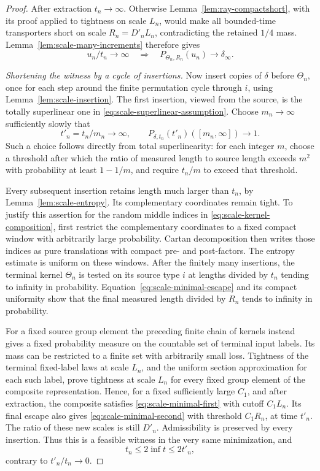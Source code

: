\begin{proof}
After extraction \(t_n\to\infty\).  Otherwise
Lemma~\ref{lem:ray-compactshort}, with its proof applied to
tightness on scale \(L_n\), would make all bounded-time
transporters short on scale \(R_n=D'_nL_n\), contradicting
the retained \(1/4\) mass.  Lemma~\ref{lem:scale-many-increments}
therefore gives
\begin{equation}\label{eq:scale-minimal-escape}
 u_n/t_n\to\infty
 \quad\Longrightarrow\quad
 P_{\Theta_n,R_n}(u_n)\longrightarrow\delta_\infty .
\end{equation}

\emph{Shortening the witness by a cycle of insertions.}
Now insert copies of \(\delta\) before \(\Theta_n\), once
for each step around the finite permutation cycle
through \(i\), using Lemma~\ref{lem:scale-insertion}.
The first insertion, viewed from the source, is the
totally superlinear one in
\eqref{eq:scale-superlinear-assumption}.  Choose
\(m_n\to\infty\) sufficiently slowly that
\begin{equation}
 t'_n=t_n/m_n\to\infty,\qquad
 P_{\delta,t_n}(t'_n)([m_n,\infty])\longrightarrow1 .
 \label{eq:scale-small-start}
\end{equation}
Such a choice follows directly from total superlinearity:
for each integer \(m\), choose a threshold after which
the ratio of measured length to source length exceeds
\(m^2\) with probability at least \(1-1/m\), and require
\(t_n/m\) to exceed that threshold.

Every subsequent insertion retains length much larger
than \(t_n\), by Lemma~\ref{lem:scale-entropy}.  Its
complementary coordinates remain tight.  To justify
this assertion for the random middle indices in
\eqref{eq:scale-kernel-composition}, first restrict
the complementary coordinates to a fixed compact
window with arbitrarily large probability.  Cartan
decomposition then writes those indices as pure
translations with compact pre- and post-factors.
The entropy estimate is uniform on these windows.
After the finitely many insertions, the terminal
kernel \(\Theta_n\) is tested on its source type \(i\)
at lengths divided by \(t_n\) tending to infinity in
probability.  Equation~\eqref{eq:scale-minimal-escape}
and its compact uniformity show that the final measured
length divided by \(R_n\) tends to infinity in probability.

For a fixed source group element the preceding finite
chain of kernels instead gives a fixed probability
measure on the countable set of terminal input labels.
Its mass can be restricted to a finite set with
arbitrarily small loss.  Tightness of the terminal
fixed-label laws at scale \(L_n\), and the uniform
section approximation for each such label, prove
tightness at scale \(L_n\) for every fixed group
element of the composite representation.  Hence,
for a fixed sufficiently large \(C_1\), and after
extraction, the composite satisfies
\eqref{eq:scale-minimal-first} with cutoff \(C_1L_n\).
Its final escape also gives
\eqref{eq:scale-minimal-second} with threshold
\(C_1R_n\), at time \(t'_n\).
The ratio of these new scales is still \(D'_n\).
Admissibility is preserved by every insertion.
Thus this is a feasible witness in the very same
minimization, and
\[
 t_n\le2\inf t\le2t'_n,
\]
contrary to \(t'_n/t_n\to0\).


\end{proof}
